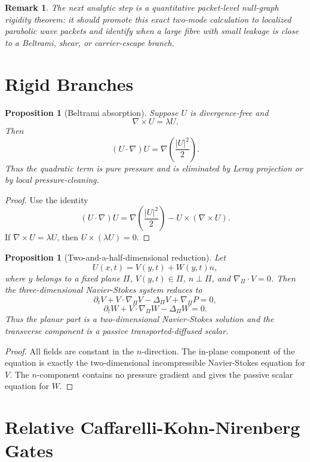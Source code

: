 \documentclass[11pt]{article}
\newtheorem{proposition}[theorem]{Proposition}
\newtheorem{remark}[theorem]{Remark}
\begin{document}
\begin{remark}
The next analytic step is a quantitative packet-level null-graph rigidity theorem: it should promote this exact two-mode calculation to localized parabolic wave packets and identify when a large fibre with small leakage is close to a Beltrami, shear, or carrier-escape branch.
\end{remark}

\section{Rigid Branches}

\begin{proposition}[Beltrami absorption]
Suppose \(U\) is divergence-free and
\[
\nabla\times U=\lambda U.
\]
Then
\[
(U\cdot\nabla)U
=
\nabla\left(\frac{|U|^2}{2}\right).
\]
Thus the quadratic term is pure pressure and is eliminated by Leray projection or by local pressure-cleaning.
\end{proposition}

\begin{proof}
Use the identity
\[
(U\cdot\nabla)U
=
\nabla\left(\frac{|U|^2}{2}\right)
-U\times(\nabla\times U).
\]
If \(\nabla\times U=\lambda U\), then \(U\times(\lambda U)=0\).
\end{proof}

\begin{proposition}[Two-and-a-half-dimensional reduction]
Let
\[
U(x,t)=V(y,t)+W(y,t)n,
\]
where \(y\) belongs to a fixed plane \(\Pi\), \(V(y,t)\in\Pi\), \(n\perp\Pi\), and \(\nabla_\Pi\cdot V=0\). Then the three-dimensional Navier-Stokes system reduces to
\[
\partial_t V+V\cdot\nabla_\Pi V-\Delta_\Pi V+\nabla_\Pi P=0,
\]
\[
\partial_t W+V\cdot\nabla_\Pi W-\Delta_\Pi W=0.
\]
Thus the planar part is a two-dimensional Navier-Stokes solution and the transverse component is a passive transported-diffused scalar.
\end{proposition}

\begin{proof}
All fields are constant in the \(n\)-direction. The in-plane component of the equation is exactly the two-dimensional incompressible Navier-Stokes equation for \(V\). The \(n\)-component contains no pressure gradient and gives the passive scalar equation for \(W\).
\end{proof}

\section{Relative Caffarelli-Kohn-Nirenberg Gates}
\end{document}
